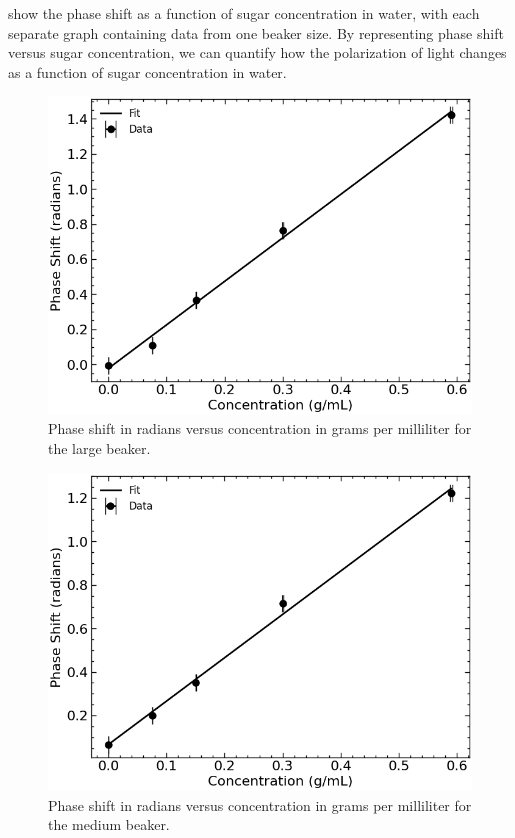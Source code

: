  show the phase shift as a function of sugar concentration in water, with each separate graph containing data from one beaker size. By representing phase shift versus sugar concentration, we can quantify how the polarization of light changes as a function of sugar concentration in water.

\begin{figure}[H]
    \begin{center}
        \includegraphics[width=\columnwidth]{../figures/large_beaker_phase_shifts.png}
    \end{center}
    \caption{Phase shift in radians versus concentration in grams per milliliter for the large beaker.}
    \label{large_beaker_phase_shifts_figure}
\end{figure}

\begin{figure}[H]
    \begin{center}
        \includegraphics[width=\columnwidth]{../figures/medium_beaker_phase_shifts.png}
    \end{center}
    \caption{Phase shift in radians versus concentration in grams per milliliter for the medium beaker.}
    \label{medium_beaker_phase_shifts_figure}
\end{figure}

